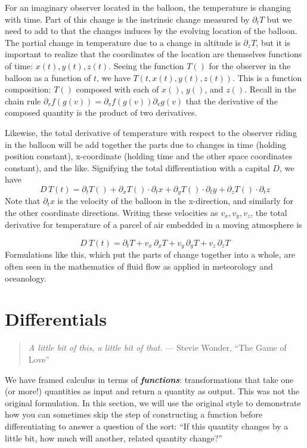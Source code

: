 \documentclass[
  letterpaper,
  DIV=11,
  numbers=noendperiod,
  oneside]{scrreprt}
\begin{document}
For an imaginary observer located in the balloon, the temperature is
changing with time. Part of this change is the instrinsic change
measured by \(\partial_t T\) but we need to add to that the changes
induces by the evolving location of the balloon. The partial change in
temperature due to a change in altitude is \(\partial_z T\), but it is
important to realize that the coordinates of the location are themselves
functions of time: \(x(t), y(t), z(t)\). Seeing the function \(T()\) for
the observer in the balloon as a function of \(t\), we have
\(T(t, x(t), y(t), z(t))\). This is a function composition: \(T()\)
composed with each of \(x()\), \(y()\), and \(z()\). Recall in the chain
rule \(\partial_v f(g(v)) = \partial_v f(g(v)) \partial_v g(v)\) that
the derivative of the composed quantity is the product of two
derivatives.

Likewise, the total derivative of temperature with respect to the
observer riding in the balloon will be add together the parts due to
changes in time (holding position constant), x-coordinate (holding time
and the other space coordinates constant), and the like. Signifying the
total differentiation with a capital \(D\), we have
\[D\, T(t) = \partial_t T() + \partial_x T() \cdot\partial_t x + \partial_y T()\cdot \partial_t y + \partial_z T() \cdot\partial_t z\]
Note that \(\partial_t x\) is the velocity of the balloon in the
x-direction, and similarly for the other coordinate directions. Writing
these velocities as \(v_x, v_y, v_z\), the total derivative for
temperature of a parcel of air embedded in a moving atmosphere is

\[D\ T(t) = \partial_t T + v_x\, \partial_x T + v_y\, \partial_y T + v_z\, \partial_z T\]
Formulations like this, which put the parts of change together into a
whole, are often seen in the mathematics of fluid flow as applied in
meteorology and oceanology.

\hypertarget{sec-differential-skier}{%
\section{Differentials}\label{sec-differential-skier}}

\begin{quote}
\emph{A little bit of this, a little bit of that.} --- Stevie Wonder,
``The Game of Love''
\end{quote}

We have framed calculus in terms of \textbf{\emph{functions}}:
transformations that take one (or more!) quantities as input and return
a quantity as output. This was not the original formulation. In this
section, we will use the original style to demonstrate how you can
sometimes skip the step of constructing a function before
differentiating to answer a question of the sort: ``If this quantity
changes by a little bit, how much will another, related quantity
change?''
\end{document}
